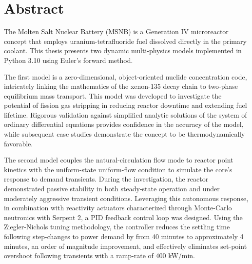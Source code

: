 \chapter{Abstract}
The Molten Salt Nuclear Battery (MSNB) is a Generation IV microreactor concept that employs uranium-tetrafluoride fuel dissolved directly in the primary coolant. This thesis presents two dynamic multi-physics models implemented in Python 3.10 using Euler's forward method. 

The first model is a zero-dimensional, object-oriented nuclide concentration code, intricately linking the mathematics of the xenon-135 decay chain to two-phase equilibrium mass transport. This model was developed to investigate the potential of fission gas stripping in reducing reactor downtime and extending fuel lifetime. Rigorous validation against simplified analytic solutions of the system of ordinary differential equations provides confidence in the accuracy of the model, while subsequent case studies demonstrate the concept to be thermodynamically favorable.

The second model couples the natural-circulation flow mode to reactor point kinetics with the uniform-state uniform-flow condition to simulate the core's response to demand transients. During the investigation, the reactor demonstrated passive stability in both steady-state operation and under moderately aggressive transient conditions. Leveraging this autonomous response, in combination with reactivity actuators characterized through Monte-Carlo neutronics with Serpent 2, a PID feedback control loop was designed. Using the Ziegler-Nichols tuning methodology, the controller reduces the settling time following step-changes to power demand by from 40 minutes to approximately 4 minutes, an order of magnitude improvement, and effectively eliminates set-point overshoot following transients with a ramp-rate of 400 kW/min.

